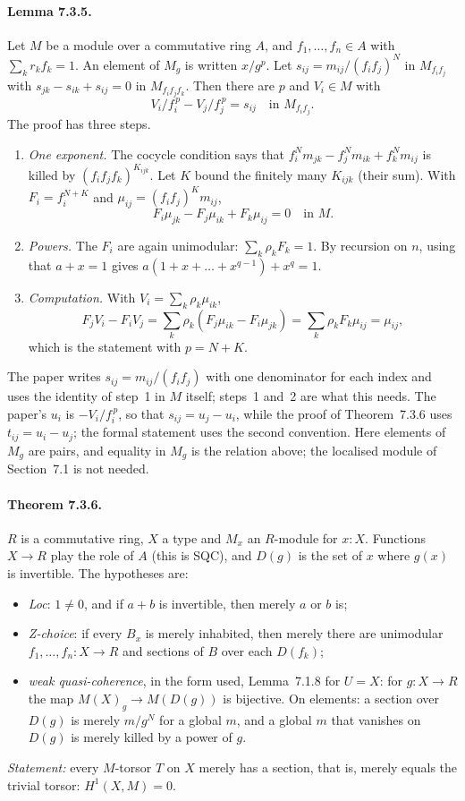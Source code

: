\documentclass[11pt]{article}
\theoremstyle{remark}
\begin{document}
\paragraph{Lemma 7.3.5.} Let $M$ be a module over a commutative ring $A$,
and $f_1,\dots,f_n\in A$ with $\sum_k r_kf_k=1$. An element of $M_g$ is
written $x/g^p$. Let $s_{ij}=m_{ij}/(f_if_j)^N$ in $M_{f_if_j}$ with
$s_{jk}-s_{ik}+s_{ij}=0$ in $M_{f_if_jf_k}$. Then there are $p$ and
$V_i\in M$ with
\[
  V_i/f_i^{\,p}-V_j/f_j^{\,p}=s_{ij}\quad\text{in }M_{f_if_j}.
\]
The proof has three steps.
\begin{enumerate}
\item \emph{One exponent.} The cocycle condition says that
  $f_i^Nm_{jk}-f_j^Nm_{ik}+f_k^Nm_{ij}$ is killed by
  $(f_if_jf_k)^{K_{ijk}}$. Let $K$ bound the finitely many $K_{ijk}$ (their
  sum). With $F_i=f_i^{N+K}$ and $\mu_{ij}=(f_if_j)^Km_{ij}$,
  \[F_i\mu_{jk}-F_j\mu_{ik}+F_k\mu_{ij}=0\quad\text{in }M.\]
\item \emph{Powers.} The $F_i$ are again unimodular:
  $\sum_k\rho_kF_k=1$. By recursion on $n$, using that $a+x=1$ gives
  $a(1+x+\dots+x^{q-1})+x^q=1$.
\item \emph{Computation.} With $V_i=\sum_k\rho_k\mu_{ik}$,
  \[F_jV_i-F_iV_j=\textstyle\sum_k\rho_k(F_j\mu_{ik}-F_i\mu_{jk})
    =\sum_k\rho_kF_k\mu_{ij}=\mu_{ij},\]
  which is the statement with $p=N+K$.
\end{enumerate}
The paper writes $s_{ij}=m_{ij}/(f_if_j)$ with one denominator for
each index and uses the identity of step~1 in $M$ itself; steps~1 and~2
are what this needs. The paper's $u_i$ is $-V_i/f_i^{\,p}$, so that
$s_{ij}=u_j-u_i$, while the proof of Theorem~7.3.6 uses
$t_{ij}=u_i-u_j$; the formal statement uses the second convention. Here
elements of $M_g$ are pairs, and equality in $M_g$ is the relation
above; the localised module of Section~7.1 is not needed.

\paragraph{Theorem 7.3.6.} $R$ is a commutative ring, $X$ a type and
$M_x$ an $R$-module for $x:X$. Functions $X\to R$ play the role of $A$
(this is SQC), and $D(g)$ is the set of $x$ where $g(x)$ is invertible.
The hypotheses are:
\begin{itemize}
\item \emph{Loc}: $1\ne0$, and if $a+b$ is invertible, then merely $a$
  or $b$ is;
\item \emph{Z-choice}: if every $B_x$ is merely inhabited, then merely
  there are unimodular $f_1,\dots,f_n:X\to R$ and sections of $B$ over
  each $D(f_k)$;
\item \emph{weak quasi-coherence}, in the form used, Lemma~7.1.8 for
  $U=X$: for $g:X\to R$ the map $M(X)_g\to M(D(g))$ is bijective. On
  elements: a section over $D(g)$ is merely $m/g^N$ for a global $m$,
  and a global $m$ that vanishes on $D(g)$ is merely killed by a power
  of $g$.
\end{itemize}
\emph{Statement:} every $M$-torsor $T$ on $X$ merely has a section, that
is, merely equals the trivial torsor: $H^1(X,M)=0$.
\end{document}
